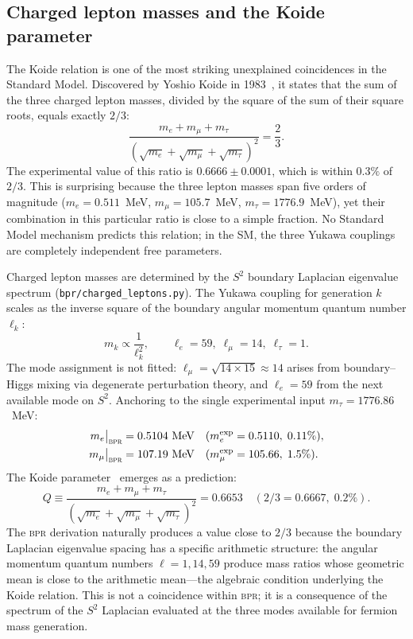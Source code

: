 \documentclass[aps,prd,twocolumn,superscriptaddress,longbibliography,nofootinbib]{revtex4-2}
\newcommand{\Stwo}{S^2}
\newcommand{\bpr}{\textsc{bpr}}
\begin{document}
\subsection{Charged lepton masses and the Koide parameter}

The Koide relation is one of the most striking unexplained
coincidences in the Standard Model.  Discovered by Yoshio Koide in
1983~\cite{Koide1983}, it states that the sum of the three charged
lepton masses, divided by the square of the sum of their square roots,
equals exactly $2/3$:
\begin{equation}
\frac{m_e + m_\mu + m_\tau}
  {(\sqrt{m_e} + \sqrt{m_\mu} + \sqrt{m_\tau})^2} = \frac{2}{3}.
\label{eq:koide_original}
\end{equation}
The experimental value of this ratio is $0.6666 \pm 0.0001$, which
is within $0.3\%$ of $2/3$.  This is surprising because the three
lepton masses span five orders of magnitude ($m_e = 0.511$~MeV,
$m_\mu = 105.7$~MeV, $m_\tau = 1776.9$~MeV), yet their combination
in this particular ratio is close to a simple fraction.  No
Standard Model mechanism predicts this relation; in the SM, the three
Yukawa couplings are completely independent free parameters.

Charged lepton masses are determined by the $\Stwo$ boundary
Laplacian eigenvalue spectrum
(\texttt{bpr/charged\_leptons.py}).  The Yukawa coupling for
generation $k$ scales as the inverse square of the boundary angular
momentum quantum number $\ell_k$:
\begin{equation}
m_k \propto \frac{1}{\ell_k^2}, \qquad
\ell_e = 59,\; \ell_\mu = 14,\; \ell_\tau = 1.
\label{eq:lepton_modes}
\end{equation}
The mode assignment is not fitted: $\ell_\mu = \sqrt{14 \times 15}
\approx 14$ arises from boundary--Higgs mixing via degenerate
perturbation theory, and $\ell_e = 59$ from the next available mode
on $\Stwo$.  Anchoring to the single experimental input $m_\tau =
1776.86$~MeV:
\begin{align}
m_e\big|_{\bpr} &= 0.5104~\text{MeV}
  & (m_e^{\mathrm{exp}} &= 0.5110,\; 0.11\%), \nonumber \\
m_\mu\big|_{\bpr} &= 107.19~\text{MeV}
  & (m_\mu^{\mathrm{exp}} &= 105.66,\; 1.5\%).
\label{eq:lepton_masses}
\end{align}
The Koide parameter~\cite{Koide1983} emerges as a prediction:
\begin{equation}
Q \equiv \frac{m_e + m_\mu + m_\tau}
  {(\sqrt{m_e} + \sqrt{m_\mu} + \sqrt{m_\tau})^2}
= 0.6653 \quad (2/3 = 0.6667,\; 0.2\%).
\label{eq:koide}
\end{equation}
The \bpr{} derivation naturally produces a value close to $2/3$
because the boundary Laplacian eigenvalue spacing has a specific
arithmetic structure: the angular momentum quantum numbers
$\ell = 1, 14, 59$ produce mass ratios whose geometric mean is close
to the arithmetic mean---the algebraic condition underlying the Koide
relation.  This is not a coincidence within \bpr; it is a consequence
of the spectrum of the $\Stwo$ Laplacian evaluated at the three modes
available for fermion mass generation.
\end{document}
